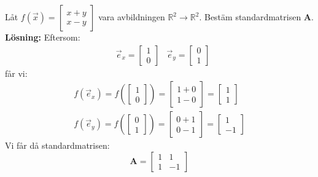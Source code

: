 \begin{Ex}
    Låt $f(\vec{x}) = \begin{bmatrix} x+y\\x-y \end{bmatrix}$ vara avbildningen $\mathbb{R}^2\rightarrow \mathbb{R}^2$. Bestäm standardmatrisen $\mathbf{A}$.\\
    \textbf{Lösning:} Eftersom:
    \begin{align*}
    &\vec{e}_x = \begin{bmatrix} 1\\0 \end{bmatrix} &\vec{e}_y = \begin{bmatrix} 0\\1 \end{bmatrix}
    \end{align*}
    får vi:
    \begin{gather}
    	f(\vec{e}_x) = f(\begin{bmatrix} 1\\0 \end{bmatrix}) = \begin{bmatrix} 1+0\\1-0 \end{bmatrix} = \begin{bmatrix} 1\\1 \end{bmatrix} \\
    	f(\vec{e}_y) = f(\begin{bmatrix} 0\\1 \end{bmatrix}) = \begin{bmatrix} 0+1\\0-1 \end{bmatrix} = \begin{bmatrix} 1\\-1 \end{bmatrix}
    \end{gather}
    Vi får då standardmatrisen:
    \[
        \mathbf{A} = \begin{bmatrix} 1&1\\1&-1 \end{bmatrix}
    \]
\end{Ex}
\newpage
